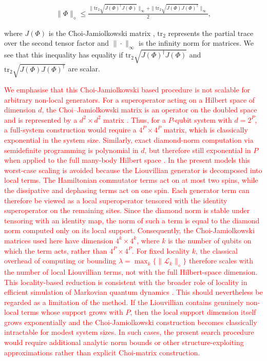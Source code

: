 \documentclass[pdflatex,sn-mathphys-num]{sn-jnl}%
\begin{document}
\begin{align}
    \|\Phi\|_{\diamond}\leq \frac{\|\mathrm{tr}_{2}\sqrt{J(\Phi)^{\dagger}J(\Phi)}\|_{\infty}+\|\mathrm{tr}_{2}\sqrt{J(\Phi)J(\Phi)^{\dagger}}\|_{\infty}}{2},
\end{align}

\noindent where $J(\Phi)$ is the Choi-Jamiolkowski matrix \cite{choi1975completely}, $\mathrm{tr}_{2}$ represents the partial trace over the second tensor factor and $\|\cdot\|_{\infty}$ is the infinity norm for matrices. We see that this inequality has equality if $\mathrm{tr}_{2}\sqrt{J(\Phi)^{\dagger}J(\Phi)}$ and $\mathrm{tr}_{2}\sqrt{J(\Phi)J(\Phi)^{\dagger}}$ are scalar. 

\textcolor{red}{We emphasise that this Choi-Jamiolkowski based procedure is not scalable for arbitrary non-local generators. For a superoperator acting on a Hilbert space of dimension $d$, the Choi--Jamiolkowski matrix is an operator on the doubled space and is represented by a $d^{2}\times d^{2}$ matrix \cite{choi1975completely}. Thus, for a $P$-qubit system with $d=2^{P}$, a full-system construction would require a $4^{P}\times 4^{P}$ matrix, which is classically exponential in the system size. Similarly, exact diamond-norm computation via semidefinite programming is polynomial in $d$, but therefore still exponential in $P$ when applied to the full many-body Hilbert space \cite{Watrous2009}.
In the present models this worst-case scaling is avoided because the Liouvillian generator is decomposed into local terms. The Hamiltonian commutator terms act on at most two spins, while the dissipative and dephasing terms act on one spin. Each generator term can therefore be viewed as a local superoperator tensored with the identity superoperator on the remaining sites. Since the diamond norm is stable under tensoring with an identity map, the norm of such a term is equal to the diamond norm computed only on its local support. Consequently, the Choi-Jamiolkowski matrices used here have dimension $4^{k}\times 4^{k}$, where $k$ is the number of qubits on which the term acts, rather than $4^{P}\times 4^{P}$. For fixed locality $k$, the classical overhead of computing or bounding $\lambda=\max_k\{\|\mathcal{L}_k\|_\diamond\}$ therefore scales with the number of local Liouvillian terms, not with the full Hilbert-space dimension. This locality-based reduction is consistent with the broader role of locality in efficient simulation of Markovian quantum dynamics \cite{BarthelKliesch2012}.
This should nevertheless be regarded as a limitation of the method. If the Liouvillian contains genuinely non-local terms whose support grows with $P$, then the local support dimension itself grows exponentially and the Choi-Jamiolkowski construction becomes classically intractable for modest system sizes. In such cases, the present search procedure would require additional analytic norm bounds or other structure-exploiting approximations rather than explicit Choi-matrix construction.}
\end{document}
